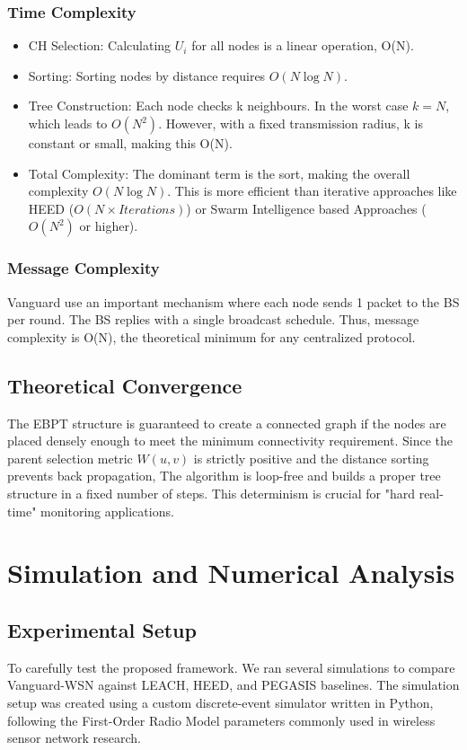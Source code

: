 \documentclass[conference]{IEEEtran}
\begin{document}
\subsubsection{Time Complexity}
\begin{itemize}
    \item CH Selection: Calculating $U_i$ for all nodes is a linear operation, O(N).
    \item Sorting: Sorting nodes by distance requires $O(N \log N)$.
    \item Tree Construction: Each node checks k neighbours. In the worst case $k=N$, which leads to $O(N^2)$. However, with a fixed transmission radius, k is constant or small, making this O(N).
    \item Total Complexity: The dominant term is the sort, making the overall complexity $O(N \log N)$. This is more efficient than iterative approaches like HEED ($O(N \times Iterations)$) or Swarm Intelligence based Approaches ($O(N^2)$ or higher).
\end{itemize}

\subsubsection{Message Complexity}
Vanguard use an important mechanism where each node sends 1 packet to the BS per round. The BS replies with a single broadcast schedule. Thus, message complexity is O(N), the theoretical minimum for any centralized protocol.

\subsection{Theoretical Convergence}
The EBPT structure is guaranteed to create a connected graph if the nodes are placed densely enough to meet the minimum connectivity requirement. Since the parent selection metric $W(u, v)$ is strictly positive and the distance sorting prevents back propagation, The algorithm is loop-free and builds a proper tree structure in a fixed number of steps. This determinism is crucial for "hard real-time" monitoring applications.

\section{Simulation and Numerical Analysis}

\subsection{Experimental Setup}
To carefully test the proposed framework. We ran several simulations to compare Vanguard-WSN against LEACH, HEED, and PEGASIS baselines. The simulation setup was created using a custom discrete-event simulator written in Python, following the First-Order Radio Model parameters commonly used in wireless sensor network research.
\end{document}
